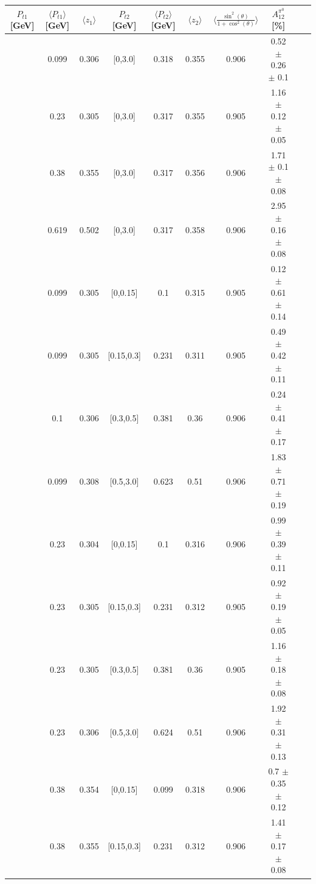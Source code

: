 \documentclass[aps,prX,preprint,groupedaddress,linenumbers]{revtex4-1}
\begin{document}
\begin{table}[H]
\centering
\begin{tabular}{|c| c| c| c| c| c| c| c| c| c|}
\hline
$P_{t1}$   [GeV] & $\langle  P_{t1}  \rangle$ [GeV] & $\langle  z_1 \rangle$& $P_{t2}$  [GeV] & $\langle  P_{t2}\rangle$  [GeV] &  $\langle  z_2 \rangle$  &$\langle\frac{\sin^2(\theta)}{1+\cos^2(\theta)}\rangle$&  $A_{12}^{\pi^0}$ [\%]  \\ \hline
[0,0.15]	&	0.099	&	0.306	&	[0,3.0]	&	0.318	&	0.355	&	0.906	&     0.52  $\pm$ 0.26  $\pm$ 0.1 	\\ \hline
[0.15,0.3]	&	0.23	        &	0.305	&	[0,3.0]	&	0.317	&	0.355	&	0.905  &1.16  $\pm$ 0.12  $\pm$ 0.05 	\\ \hline
[0.3,0.5]	&	0.38	        &	0.355	&	[0,3.0]	&	0.317	&	0.356	&	0.906 & 1.71  $\pm$ 0.1  $\pm$ 0.08   	\\ \hline
[0.5,3.0]	&	0.619	&	0.502	&	[0,3.0]	&	0.317	&	0.358	&	0.906	&     2.95  $\pm$ 0.16  $\pm$ 0.08 	\\ \hline
\hline
[0,0.15]	&	0.099	&	0.305	&	[0,0.15]	&	0.1	        &	0.315	&	0.905	&0.12  $\pm$ 0.61  $\pm$ 0.14  	\\ \hline
[0,0.15]	&	0.099	&	0.305	&	[0.15,0.3]	&	0.231	&	0.311	&	0.905   	&0.49  $\pm$ 0.42  $\pm$ 0.11  	\\ \hline
[0,0.15]	&	0.1	        &	0.306	&	[0.3,0.5]	&	0.381	&	0.36	         &0.906       &0.24  $\pm$ 0.41  $\pm$ 0.17       	\\ \hline
[0,0.15]	&	0.099	&	0.308	&	[0.5,3.0]	&	0.623	&	0.51	        &	0.906	&1.83  $\pm$ 0.71  $\pm$ 0.19  		\\ \hline
\hline
[0.15,0.3]	&	0.23	        &	0.304	&	[0,0.15]	&	0.1	        &	0.316	&0.906        &0.99  $\pm$ 0.39  $\pm$ 0.11  	\\ \hline
[0.15,0.3]	&	0.23	        &	0.305	&	[0.15,0.3]	&	0.231	&	0.312	&	0.905	&0.92  $\pm$ 0.19  $\pm$ 0.05  		\\ \hline
[0.15,0.3]	&	0.23	        &	0.305	&	[0.3,0.5]	&	0.381	&	0.36	        &0.905	&1.16  $\pm$ 0.18  $\pm$ 0.08  	\\ \hline
[0.15,0.3]	&	0.23	        &	0.306	&	[0.5,3.0]	&	0.624	&	0.51	        & 0.906	& 1.92  $\pm$ 0.31  $\pm$ 0.13 	\\ \hline
\hline
[0.3,0.5]	&	0.38	        &	0.354	&	[0,0.15]	&	0.099	&	0.318	&	0.906	&0.7  $\pm$ 0.35  $\pm$ 0.12   		\\ \hline
[0.3,0.5]	&	0.38	        &	0.355	&	[0.15,0.3]	&	0.231	&	0.312	&	0.906	&1.41  $\pm$ 0.17  $\pm$ 0.08  	\\ \hline

\end{tabular}
\end{table}
\end{document}
